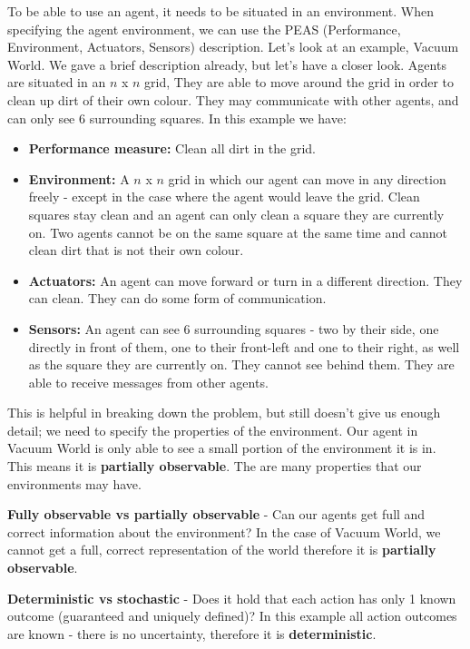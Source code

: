 \documentclass[]{final_report}
\begin{document}
To be able to use an agent, it needs to be situated in an environment. When specifying the agent environment, we can use the PEAS (Performance, Environment, Actuators, Sensors) description. Let's look at an example, Vacuum World. We gave a brief description already, but let's have a closer look. Agents are situated in an $n$ x $n$ grid, They are able to move around the grid in order to clean up dirt of their own colour. They may communicate with other agents, and can only see 6 surrounding squares. In this example we have:
\begin{itemize}
    \item \textbf{Performance measure:} Clean all dirt in the grid.
    \item \textbf{Environment:} A $n$ x $n$ grid in which our agent can move in any direction freely - except in the case where the agent would leave the grid. Clean squares stay clean and an agent can only clean a square they are currently on. Two agents cannot be on the same square at the same time and cannot clean dirt that is not their own colour.
    \item \textbf{Actuators:} An agent can move forward or turn in a different direction. They can clean. They can do some form of communication.
    \item \textbf{Sensors:} An agent can see 6 surrounding squares - two by their side, one directly in front of them, one to their front-left and one to their right,  as well as the square they are currently on. They cannot see behind them. They are able to receive messages from other agents.
\end{itemize}

This is helpful in breaking down the problem, but still doesn't give us enough detail; we need to specify the properties of the environment. Our agent in Vacuum World is only able to see a small portion of the environment it is in. This means it is \textbf{partially observable}. The are many properties that our environments may have.

\textbf{Fully observable vs partially observable} - Can our agents get full and correct information about the environment? In the case of Vacuum World, we cannot get a full, correct representation of the world therefore it is \textbf{partially observable}.

\textbf{Deterministic vs stochastic} - Does it hold that each action has only 1 known outcome (guaranteed and uniquely defined)? In this example all action outcomes are known - there is no uncertainty, therefore it is \textbf{deterministic}.
\end{document}
